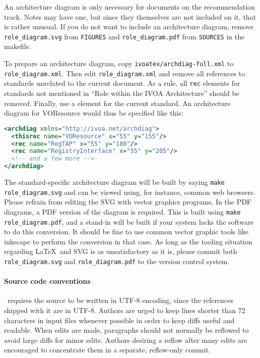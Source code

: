 \documentclass[11pt,a4paper]{ivoa}
\begin{document}
An architecture diagram is only 
necessary for documents on the recommendation track.  Notes may have
one, but since they themselves are not included on it, that is rather
unusual.  If you do not want to include an architecture diagram, remove
\texttt{role\_diagram.svg} from \texttt{FIGURES} and
\texttt{role\_diagram.pdf} from \texttt{SOURCES} in the makefile.

To prepare an architecture diagram, copy
\texttt{ivoatex/archdiag-full.xml} to \texttt{role\_diagram.xml}.  Then edit
\texttt{role\_diagram.xml} and remove all references to standards unrelated
to the current document.  As a rule, all \texttt{rec} elements for
standards not mentioned in
``Role within the IVOA Architecture'' should be removed.  Finally, use a
 element for the current standard.  An architecture
diagram for VOResource would thus be specified like this:

\begin{lstlisting}[language=XML,basicstyle=\footnotesize]
<archdiag xmlns="http://ivoa.net/archdiag">
  <thisrec name="VOResource" x="55" y="155"/>
  <rec name="RegTAP" x="55" y="180"/>
  <rec name="RegistryInterface" x="55" y="205"/>
  <!-- and a few more -->
</archdiag>
\end{lstlisting}

The standard-specific
architecture diagram will be built by saying \texttt{make
role\_diagram.svg} and can be viewed using, for instance, common web
browsers.  Please refrain from editing the SVG with vector graphics
programs.  In the PDF diagrams, a PDF version of the diagram is
required.  This is built using \texttt{make role\_diagram.pdf}, and a
stand-in will be built if your system lacks the software to do this
conversion.  It should be fine to use common vector graphic tools like
inkscape to perform the conversion in that case.
As long as the tooling situation regarding \LaTeX~and SVG is as
unsatisfactory as it is, please commit both \texttt{role\_diagram.svg} and
\texttt{role\_diagram.pdf} to the version control system.

\paragraph{Source code conventions}

\ivoatex\ requires the source to be written in UTF-8 encoding, since the
references shipped with it are in UTF-8.
Authors are urged to keep lines shorter than 72 characters in input
files whenever possible in order to keep diffs useful and readable.
When edits are made, paragraphs should not normally be reflowed to avoid
large diffs for minor edits.  Authors desiring a reflow after many edits
are encouraged to concentrate them in a separate, reflow-only commit.
\end{document}

